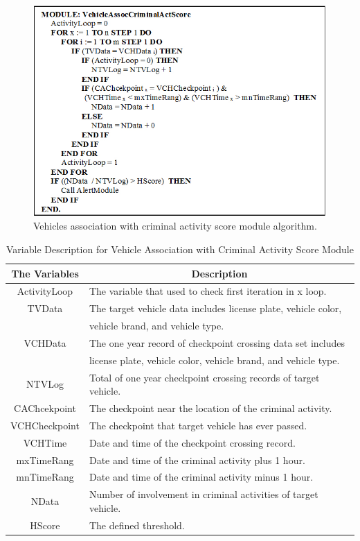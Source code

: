 \begin{figure}
\centering
\includegraphics[width=1\textwidth]{images/activityAlgorithm2.jpg}
\caption{Vehicles association with criminal activity score module algorithm.}
\label{fig:activityAlgo}
\end{figure}

\begin{table}[!t]
\renewcommand{\arraystretch}{1.2}
\caption{Variable Description for Vehicle Association with Criminal Activity Score Module}
\label{table_variableActivity}
\centering
\begin{tabular}{c|l}
\hline
\bfseries The Variables & \multicolumn{1}{c}{\bfseries Description}\\
\hline
ActivityLoop & The variable that used to check first iteration in x loop.\\
\hline
TVData & The target vehicle data includes license plate, 
vehicle color, \\ & vehicle brand, and vehicle type.\\
\hline
VCHData & The one year record of checkpoint crossing data set includes  \\ & license plate, vehicle color, vehicle brand, and vehicle type.\\
\hline
NTVLog & Total of one year checkpoint crossing records of target vehicle.\\
\hline
CAChcekpoint & The checkpoint near the location of the criminal activity.\\
\hline
VCHCheckpoint & The checkpoint that target vehicle has ever passed.\\
\hline
VCHTime & Date and time of the checkpoint crossing record.\\
\hline
mxTimeRang & Date and time of the criminal activity plus 1 hour.\\
\hline
mnTimeRang & Date and time of the criminal activity minus 1 hour.\\
\hline
NData & Number of involvement in criminal activities of target vehicle.\\
\hline
HScore & The defined threshold.\\
\hline
\end{tabular}
\end{table}

